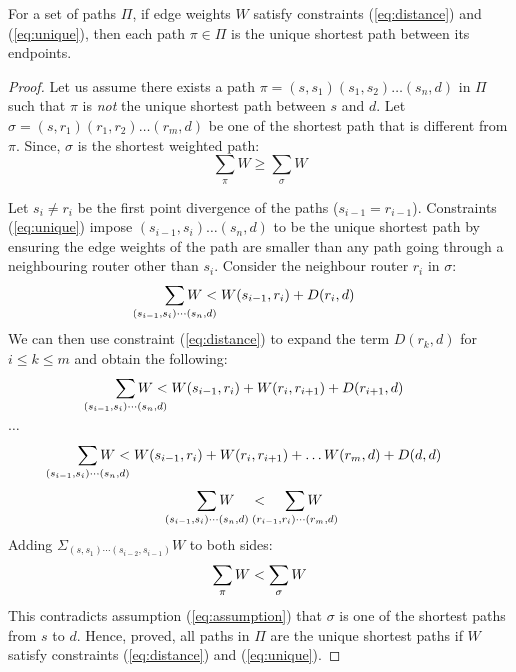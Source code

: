 \begin{theorem}[Soundness]
For a set of paths $\Pi$, if edge weights 
$W$ satisfy constraints (\ref{eq:distance}) and (\ref{eq:unique}), then 
each path $\pi \in \Pi$ is the unique shortest path between its endpoints. 
\end{theorem}
\begin{proof}
	Let us assume there exists a path $\pi
	= (s, s_1)(s_1, s_2) 
	\ldots (s_n, d)$ in $\Pi$ such that $\pi$ is \emph{not} the unique 
	shortest path between $s$ and $d$. Let  $\sigma = (s, r_1)(r_1, r_2)\ldots (r_m,
	 d)$ be one of the shortest path that is different from $\pi$. 	
	\noindent Since, $\sigma$ is the shortest weighted path: 
	\begin{equation} \label{eq:assumption}
	\sum_{\pi} W \geq \sum_{\sigma} W
	\end{equation}
	
    Let $s_i \not= r_i$ be the first point divergence of the paths ($s_{i-1} = r_{i-1}$). Constraints (\ref{eq:unique}) 
	impose $(s_{i-1}, s_i)\ldots(s_n, d)$ to be the
	unique shortest path by ensuring the edge weights of the path
	are smaller than any path going through a neighbouring 
	router other than $s_i$. 
	Consider the 
	neighbour router $r_i$ in $\sigma$:
	\[
	\sum_{\mathclap{\substack{(s_{i-1}, s_i)\cdots(s_n, d)}}} 
	W < W(s_{i-1}, r_i)+ D(r_i, d)
	\]
	We can then use constraint (\ref{eq:distance}) to expand the term $D(r_k, d)$ for $i \leq k \leq m$
	and obtain the following: 
	\[
	\sum_{\mathclap{\substack{(s_{i-1}, s_i)\cdots(s_n, d)}}} 
	W < W(s_{i-1}, r_i)+ W(r_i, r_{i+1}) + D(r_{i+1}, d)
	\] 
	\begin{center}
		$\ldots$
	\end{center}
	\[
	\sum_{\mathclap{\substack{(s_{i-1}, s_i)\cdots(s_n, d)}}} 
	W < W(s_{i-1}, r_i)+ W(r_i, r_{i+1}) + \ldots W(r_{m}, d) + D(d, d)
	\] 
	\[
	\sum_{\mathclap{\substack{(s_{i-1}, s_i)\cdots(s_n, d)}}} 
	W \hspace{0.4cm}< \hspace{0.4cm}
	\sum_{\mathclap{\substack{(r_{i-1}, r_i)\cdots(r_m, d)}}} 
	W
	\]
	Adding $\Sigma_{(s, s_1)\cdots(s_{i-2},s_{i-1})}W$ to both sides:
	\[
	\sum_{\mathclap{\substack{\pi}}} 
	W < 
	\sum_{\mathclap{\substack{\sigma}}} 
	W
	\] 
	This contradicts assumption (\ref{eq:assumption}) that 
	$\sigma$ is one of the shortest paths from $s$ to $d$. 
	Hence, proved, all paths in $\Pi$ are the unique shortest paths if $W$
	satisfy constraints (\ref{eq:distance}) and (\ref{eq:unique}).
\end{proof}
					
